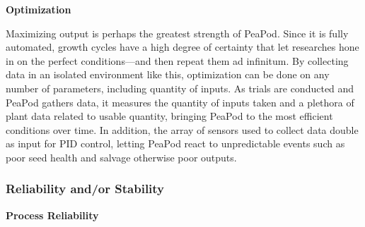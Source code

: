 \documentclass{report}
\begin{document}


\textbf{Optimization}

Maximizing output is perhaps the greatest strength of PeaPod. Since it is fully automated, growth cycles have a high degree of certainty that let researches hone in on the perfect conditions---and then repeat them ad infinitum.
By collecting data in an isolated environment like this, optimization can be done on any number of parameters, including quantity of inputs. As trials are conducted and PeaPod gathers data, it measures the quantity of inputs taken and a plethora of plant data related to usable quantity, bringing PeaPod to the most efficient conditions over time.
In addition, the array of sensors used to collect data double as input for PID control, letting PeaPod react to unpredictable events such as poor seed health and salvage otherwise poor outputs.

\subsubsection{Reliability and/or Stability}

\textbf{Process Reliability}
\end{document}
